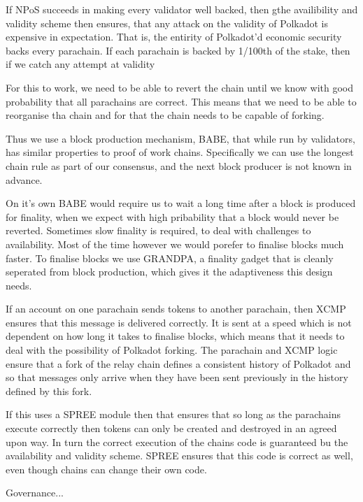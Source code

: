 If NPoS succeeds in making every validator well backed, then gthe availibility and validity scheme then ensures, that any attack on the validity of Polkadot is expensive in expectation. That is, the entirity of Polkadot'd economic security backs every parachain. If each parachain is backed by 1/100th of the stake, then if we catch any attempt at validity 

For this to work, we need to be able to revert the chain until we know with good probability that all parachains are correct. This means that we need to be able to reorganise tha chain and for that the chain needs to be capable of forking.

Thus we use a block production mechanism, BABE, that while run by validators, has similar properties to proof of work chains. Specifically we can use the longest chain rule as part of our consensus, and the next block producer is not known in advance.

On it's own BABE would require us to wait a long time after a block is produced for finality, when we expect with high pribability that a block would never be reverted. Sometimes slow finality is required, to deal with challenges to availability. Most of the time however we would porefer to finalise blocks much faster.  To finalise blocks we use GRANDPA, a finality gadget that is cleanly seperated from block production, which gives it the adaptiveness this design needs. 


If an account on one parachain sends tokens to another parachain, then XCMP ensures that this message is delivered correctly. It is sent at a speed which is not dependent on how long it takes to finalise blocks, which means that it needs to deal with the possibility of Polkadot forking. The parachain and XCMP logic ensure that a fork of the relay chain defines a consistent history of Polkadot and so that messages only arrive when they have been sent previously in the history defined by this fork.

If this uses a SPREE module then that ensures that so long as the parachains execute correctly then tokens can only be created and destroyed in an agreed upon way. In turn the correct execution of the chains code is guaranteed bu the availability and validity scheme. SPREE ensures that this code is correct as well, even though chains can change their own code.

Governance...

